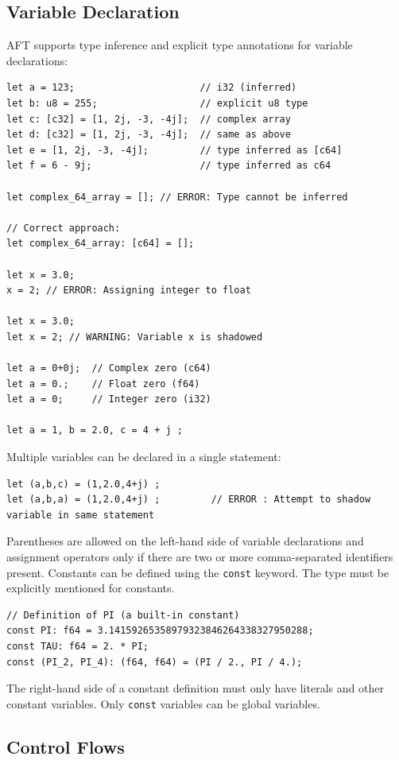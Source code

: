 \subsection{Variable Declaration}
AFT supports type inference and explicit type annotations for variable declarations:
\begin{verbatim}
let a = 123;                      // i32 (inferred)
let b: u8 = 255;                  // explicit u8 type
let c: [c32] = [1, 2j, -3, -4j];  // complex array
let d: [c32] = [1, 2j, -3, -4j];  // same as above
let e = [1, 2j, -3, -4j];         // type inferred as [c64]
let f = 6 - 9j;                   // type inferred as c64

let complex_64_array = []; // ERROR: Type cannot be inferred

// Correct approach:
let complex_64_array: [c64] = [];

let x = 3.0;
x = 2; // ERROR: Assigning integer to float

let x = 3.0;
let x = 2; // WARNING: Variable x is shadowed

let a = 0+0j;  // Complex zero (c64)
let a = 0.;    // Float zero (f64)
let a = 0;     // Integer zero (i32)

let a = 1, b = 2.0, c = 4 + j ;
\end{verbatim}
Multiple variables can be declared in a single statement:
\begin{verbatim}
let (a,b,c) = (1,2.0,4+j) ;
let (a,b,a) = (1,2.0,4+j) ;         // ERROR : Attempt to shadow variable in same statement
\end{verbatim}
Parentheses are allowed on the left-hand side of variable declarations and assignment operators only if there are two or more comma-separated identifiers present.
Constants can be defined using the \texttt{const} keyword. The type must be explicitly mentioned for constants.
\begin{verbatim}
// Definition of PI (a built-in constant)
const PI: f64 = 3.14159265358979323846264338327950288;
const TAU: f64 = 2. * PI;
const (PI_2, PI_4): (f64, f64) = (PI / 2., PI / 4.);
\end{verbatim}
The right-hand side of a constant definition must only have literals and other constant variables. Only \texttt{const} variables can be global variables.

\subsection{Control Flows}

